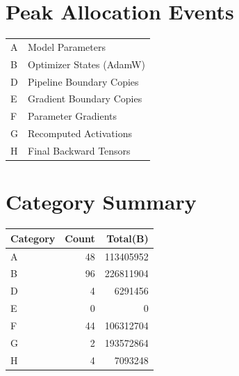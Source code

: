 \documentclass{article}
\begin{document}
\section*{Peak Allocation Events}
\small
\begin{tabular}{ll}
A & Model Parameters \\
B & Optimizer States (AdamW) \\
D & Pipeline Boundary Copies \\
E & Gradient Boundary Copies \\
F & Parameter Gradients \\
G & Recomputed Activations \\
H & Final Backward Tensors \\
\end{tabular}
\vspace{0.5em}
\section*{Category Summary}
\begin{tabular}{l r r}
Category & Count & Total(B) \\
\hline
A & 48 & 113405952 \\
B & 96 & 226811904 \\
D & 4 & 6291456 \\
E & 0 & 0 \\
F & 44 & 106312704 \\
G & 2 & 193572864 \\
H & 4 & 7093248 \\
\end{tabular}
\vspace{0.5em}
\end{document}
